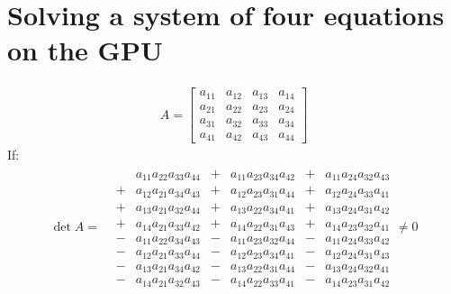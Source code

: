 \chapter{Solving a system of four equations on the GPU}\label{system of euqations}
\begin{gather}
	A = 
	\begin{bmatrix}
	a_{11}&a_{12}&a_{13}&a_{14}\\
	a_{21}&a_{22}&a_{23}&a_{24}\\
	a_{31}&a_{32}&a_{33}&a_{34}\\
	a_{41}&a_{42}&a_{43}&a_{44}
	\end{bmatrix}
\end{gather}
If:
\begin{gather}
\det{A} =
	\begin{matrix}
		&  &a_{11}a_{22}a_{33}a_{44}& + &a_{11}a_{23}a_{34}a_{42}& + &a_{11}a_{24}a_{32}a_{43} \\
		&+ &a_{12}a_{21}a_{34}a_{43}& + &a_{12}a_{23}a_{31}a_{44}& + &a_{12}a_{24}a_{33}a_{41} \\
		&+ &a_{13}a_{21}a_{32}a_{44}& + &a_{13}a_{22}a_{34}a_{41}& + &a_{13}a_{24}a_{31}a_{42} \\
		&+ &a_{14}a_{21}a_{33}a_{42}& + &a_{14}a_{22}a_{31}a_{43}& + &a_{14}a_{23}a_{32}a_{41} \\
		&- &a_{11}a_{22}a_{34}a_{43}& - &a_{11}a_{23}a_{32}a_{44}& - &a_{11}a_{24}a_{33}a_{42} \\
		&- &a_{12}a_{21}a_{33}a_{44}& - &a_{12}a_{23}a_{34}a_{41}& - &a_{12}a_{24}a_{31}a_{43} \\
		&- &a_{13}a_{21}a_{34}a_{42}& - &a_{13}a_{22}a_{31}a_{44}& - &a_{13}a_{24}a_{32}a_{41} \\
		&- &a_{14}a_{21}a_{32}a_{43}& - &a_{14}a_{22}a_{33}a_{41}& - &a_{14}a_{23}a_{31}a_{42} 
	\end{matrix}
	\neq 0
\end{gather}

